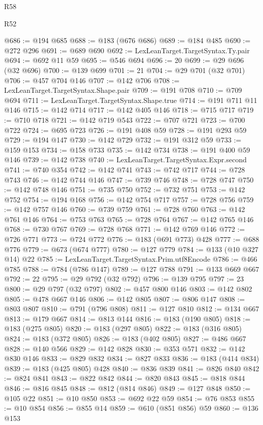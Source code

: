 \begin{lexlean}{R58}
\begin{lexlean}{R52}
\begin{coremodule}
{{{{{{{{{{{{{{{{{{{{{{{{{{{{{{{{{{{{{{{{{{{{{{{{{{{{{{{{{{{{{{{{{{{{{{{{{{{{{{{{{{{{{{{{{{{{{{{{{{{{{{{{{{{{{{{{{{{{{{{{{{{{{{{{{{{{{{{{{{{{{{{{{{{{{{{{{{{{{{{{{{{{{{{{{{{{{{{{{{{{{{{{{{{{{{{{{{{{{{@686 := @194 @685
@688 := @183 (@676 @686)
@689 := @184 @485
@690 := @272 @296
@691 := @689 @690
@692 := LexLeanTarget.TargetSyntax.Ty.pair
@694 := @692 @11 @59
@695 := @546 @694
@696 := 20
@699 := @29 @696 (@32 @696)
@700 := @139 @699
@701 := 21
@704 := @29 @701 (@32 @701)
@706 := @457 @704 @146
@707 := @142 @706
@708 := LexLeanTarget.TargetSyntax.Shape.pair
@709 := @191 @708
@710 := @709 @694
@711 := LexLeanTarget.TargetSyntax.Shape.true
@714 := @191 @711 @11 @146
@715 := @142 @714
@717 := @142 @405 @146
@718 := @715 @717
@719 := @710 @718
@721 := @142 @719 @543
@722 := @707 @721
@723 := @700 @722
@724 := @695 @723
@726 := @191 @408 @59
@728 := @191 @293 @59
@729 := @194 @147
@730 := @142 @729
@732 := @191 @312 @59
@733 := @159 @153
@734 := @158 @733
@735 := @142 @734
@738 := @191 @400 @59 @146
@739 := @142 @738
@740 := LexLeanTarget.TargetSyntax.Expr.second
@741 := @740 @354
@742 := @142 @741
@743 := @742 @717
@744 := @728 @743
@746 := @142 @744 @146
@747 := @739 @746
@748 := @728 @747
@750 := @142 @748 @146
@751 := @735 @750
@752 := @732 @751
@753 := @142 @752
@754 := @194 @168
@756 := @142 @754 @717
@757 := @728 @756
@759 := @142 @757 @146
@760 := @739 @759
@761 := @728 @760
@763 := @142 @761 @146
@764 := @753 @763
@765 := @728 @764
@767 := @142 @765 @146
@768 := @730 @767
@769 := @728 @768
@771 := @142 @769 @146
@772 := @726 @771
@773 := @724 @772
@776 := @183 (@691 @773) @428
@777 := @688 @776
@779 := @673 (@674 @777)
@780 := @127 @779
@784 := @133 (@10 @327 @14) @22
@785 := LexLeanTarget.TargetSyntax.Prim.utf8Encode
@786 := @466 @785
@788 := @784 (@786 @147)
@789 := @127 @788
@791 := @133 @669 @667
@792 := 22
@795 := @29 @792 (@32 @792)
@796 := @139 @795
@797 := 23
@800 := @29 @797 (@32 @797)
@802 := @457 @800 @146
@803 := @142 @802
@805 := @478 @667 @146
@806 := @142 @805
@807 := @806 @147
@808 := @803 @807
@810 := @791 (@796 @808)
@811 := @127 @810
@812 := @134 @667
@813 := @179 @667
@814 := @813 @144
@816 := @183 (@190 @805)
@818 := @183 (@275 @805)
@820 := @183 (@297 @805)
@822 := @183 (@316 @805)
@824 := @183 (@372 @805)
@826 := @183 (@402 @805)
@827 := @486 @667
@828 := @140 @566
@829 := @142 @828
@830 := @353 @571
@832 := @142 @830 @146
@833 := @829 @832
@834 := @827 @833
@836 := @183 (@414 @834)
@839 := @183 (@425 @805) @428
@840 := @836 @839
@841 := @826 @840
@842 := @824 @841
@843 := @822 @842
@844 := @820 @843
@845 := @818 @844
@846 := @816 @845
@848 := @812 (@814 @846)
@849 := @127 @848
@850 := @105 @22
@851 := @10 @850
@853 := @692 @22 @59
@854 := @76 @853
@855 := @10 @854
@856 := @855 @14
@859 := @610 (@851 @856) @59
@860 := @136 @153
}}}}}}}}}}}}}}}}}}}}}}}}}}}}}}}}}}}}}}}}}}}}}}}}}}}}}}}}}}}}}}}}}}}}}}}}}}}}}}}}}}}}}}}}}}}}}}}}}}}}}}}}}}}}}}}}}}}}}}}}}}}}}}}}}}}}}}}}}}}}}}}}}}}}}}}}}}}}}}}}}}}}}}}}}}}}}}}}}}}}}}}}}}}}}}}}}}}}}}
\end{coremodule}
\end{lexlean}
\end{lexlean}
